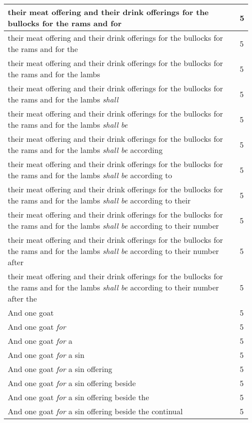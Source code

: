 \begin{center}
\begin{longtable}{|p{3.0in}|p{0.5in}|}
their meat offering and their drink offerings for the bullocks for the rams and for & 5\\ \hline 
their meat offering and their drink offerings for the bullocks for the rams and for the & 5\\ \hline 
their meat offering and their drink offerings for the bullocks for the rams and for the lambs & 5\\ \hline 
their meat offering and their drink offerings for the bullocks for the rams and for the lambs \emph{shall} & 5\\ \hline 
their meat offering and their drink offerings for the bullocks for the rams and for the lambs \emph{shall} \emph{be} & 5\\ \hline 
their meat offering and their drink offerings for the bullocks for the rams and for the lambs \emph{shall} \emph{be} according & 5\\ \hline 
their meat offering and their drink offerings for the bullocks for the rams and for the lambs \emph{shall} \emph{be} according to & 5\\ \hline 
their meat offering and their drink offerings for the bullocks for the rams and for the lambs \emph{shall} \emph{be} according to their & 5\\ \hline 
their meat offering and their drink offerings for the bullocks for the rams and for the lambs \emph{shall} \emph{be} according to their number & 5\\ \hline 
their meat offering and their drink offerings for the bullocks for the rams and for the lambs \emph{shall} \emph{be} according to their number after & 5\\ \hline 
their meat offering and their drink offerings for the bullocks for the rams and for the lambs \emph{shall} \emph{be} according to their number after the & 5\\ \hline 
And one goat & 5\\ \hline 
And one goat \emph{for} & 5\\ \hline 
And one goat \emph{for} a & 5\\ \hline 
And one goat \emph{for} a sin & 5\\ \hline 
And one goat \emph{for} a sin offering & 5\\ \hline 
And one goat \emph{for} a sin offering beside & 5\\ \hline 
And one goat \emph{for} a sin offering beside the & 5\\ \hline 
And one goat \emph{for} a sin offering beside the continual & 5\\ \hline 

\end{longtable}
\end{center}
